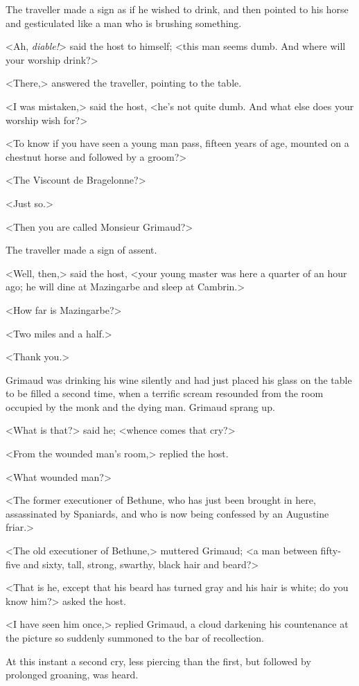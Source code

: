 The traveller made a sign as if he wished to drink, and then pointed to his horse and gesticulated like a man who is brushing something.

<Ah, \textit{diable!}> said the host to himself; <this man seems dumb. And where will your worship drink?>

<There,> answered the traveller, pointing to the table.

<I was mistaken,> said the host, <he's not quite dumb. And what else does your worship wish for?>

<To know if you have seen a young man pass, fifteen years of age, mounted on a chestnut horse and followed by a groom?>

<The Viscount de Bragelonne?>

<Just so.>

<Then you are called Monsieur Grimaud?>

The traveller made a sign of assent.

<Well, then,> said the host, <your young master was here a quarter of an hour ago; he will dine at Mazingarbe and sleep at Cambrin.>

<How far is Mazingarbe?>

<Two miles and a half.>

<Thank you.>

Grimaud was drinking his wine silently and had just placed his glass on the table to be filled a second time, when a terrific scream resounded from the room occupied by the monk and the dying man. Grimaud sprang up.

<What is that?> said he; <whence comes that cry?>

<From the wounded man's room,> replied the host.

<What wounded man?>

<The former executioner of Bethune, who has just been brought in here, assassinated by Spaniards, and who is now being confessed by an Augustine friar.>

<The old executioner of Bethune,> muttered Grimaud; <a man between fifty-five and sixty, tall, strong, swarthy, black hair and beard?>

<That is he, except that his beard has turned gray and his hair is white; do you know him?> asked the host.

<I have seen him once,> replied Grimaud, a cloud darkening his countenance at the picture so suddenly summoned to the bar of recollection.

At this instant a second cry, less piercing than the first, but followed by prolonged groaning, was heard.

